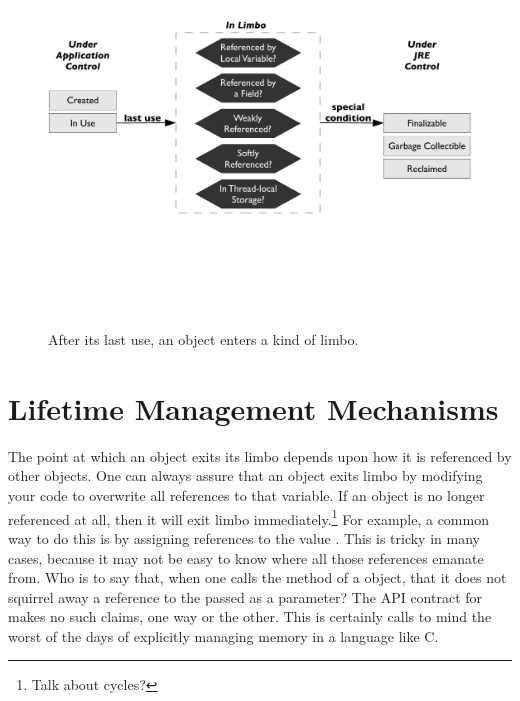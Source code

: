 \begin{figure}
	\centering
	\includegraphics[width=\textwidth]{Figures/lifetime/states}
	\caption{After its last use, an object enters a kind of limbo.}
		\label{fig:limbo-exit}
\end{figure}

\section{Lifetime Management Mechanisms}

The point at which an object exits its limbo depends upon how it is referenced by
other objects. One can always assure that an object exits limbo by modifying your
code to overwrite all references to that variable. If an object is no longer
referenced at all, then it will exit limbo immediately.\footnote{Talk about
cycles?} For example, a common way to do this is by assigning references to the
value . This is tricky in many cases, because it may not be easy to
know where all those references emanate from. Who is to say that, when one calls
the  method of a  object, that it does not
squirrel away a reference to the  passed as a parameter? The
API contract for  makes no such claims, one way or the other. This is
certainly calls to mind the worst of the days of explicitly managing memory in a
language like C.


